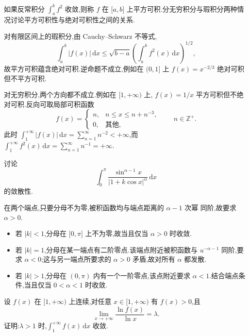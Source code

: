 \begin{example}
  如果反常积分 $\displaystyle\int_a^bf^2$ 收敛,则称 $f$ 在 $\lbrack a,b\rbrack$ 上平方可积.分无穷积分与瑕积分两种情况讨论平方可积性与绝对可积性之间的关系.
\end{example}
\exampleblank

\begin{solution}
  对有限区间上的瑕积分,由 Cauchy--Schwarz 不等式,
  \[
    \int_a^b|f(x)|\,\mathrm{d}x
    \leq\sqrt{b-a}\left(\int_a^bf^2(x)\,\mathrm{d}x\right)^{1/2},
  \]
  故平方可积蕴含绝对可积.逆命题不成立,例如在 $(0,1\rbrack$ 上
  $f(x)=x^{-2/3}$ 绝对可积但不平方可积.

  对无穷积分,两个方向都不成立.例如在 $\lbrack1,+\infty)$ 上,
  $f(x)=1/x$ 平方可积但不绝对可积.反向可取局部可积函数
  \[
    f(x)=
    \begin{cases}
      n, & n\leq x\leq n+n^{-3}, \\
      0, & \text{其他},
    \end{cases}
    \qquad n\in\mathbb{Z}^+.
  \]
  此时 $\displaystyle\int_1^{+\infty}|f(x)|\,\mathrm{d}x
    =\sum\limits_{n=1}^{\infty}n^{-2}<+\infty$,而
  $\displaystyle\int_1^{+\infty}f^2(x)\,\mathrm{d}x
    =\sum\limits_{n=1}^{\infty}n^{-1}=+\infty$.
\end{solution}

\begin{example}
  讨论
  \[
    \int_0^\pi\dfrac{\sin^{\alpha-1}x}{|1+k\cos x|^\alpha}\,\mathrm{d}x
  \]
  的敛散性.
\end{example}
\exampleblank

\begin{solution}
  在两个端点,只要分母不为零,被积函数均与端点距离的 $\alpha-1$ 次幂
  同阶,故要求 $\alpha>0$.
  \begin{itemize}
    \item 若 $|k|<1$,分母在 $\lbrack0,\pi\rbrack$ 上不为零,故当且仅当
          $\alpha>0$ 时收敛.
    \item 若 $|k|=1$,分母在某一端点有二阶零点.该端点附近被积函数与
          $u^{-\alpha-1}$ 同阶,要求 $\alpha<0$;这与另一端点所要求的
          $\alpha>0$ 矛盾,故对所有 $\alpha$ 都发散.
    \item 若 $|k|>1$,分母在 $(0,\pi)$ 内有一个一阶零点,该点附近要求
          $\alpha<1$.结合端点条件,当且仅当 $0<\alpha<1$ 时收敛.
  \end{itemize}
\end{solution}

\begin{example}
  设 $f(x)$ 在 $\lbrack 1,+\infty)$ 上连续,对任意 $x\in\lbrack 1,+\infty)$ 有 $f(x)>0$,且
  \[
    \lim\limits_{x\to+\infty}\dfrac{\ln f(x)}{\ln x}=\lambda.
  \]
  证明:$\lambda>1$ 时,$\displaystyle\int_1^{+\infty}f(x)\,\mathrm{d}x$ 收敛.
\end{example}
\exampleblank

